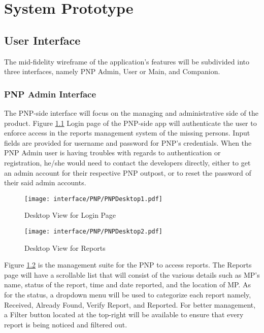 \chapter{System Prototype}

\section{User Interface}
The mid-fidelity wireframe of the application’s features will be subdivided into three interfaces, namely PNP Admin, User or Main, and Companion.

\subsection{PNP Admin Interface}
The PNP-side interface will focus on the managing and administrative side of the product. Figure \ref{fig:PNP1} Login page of the PNP-side app will authenticate the user to enforce access in the reports management system of the missing persons. Input fields are provided for username and password for PNP’s credentials. When the PNP Admin user is having troubles with regards to authentication or registration, he/she would need to contact the developers directly, either to get an admin account for their respective PNP outpost, or to reset the password of their said admin accounts.
\begin{figure}[!h]
    \centering
    \texttt{[image: interface/PNP/PNPDesktop1.pdf]}
    \caption{Desktop View for Login Page}
    \label{fig:PNP1}
\end{figure}

\begin{figure}[!h]
    \centering
    \texttt{[image: interface/PNP/PNPDesktop2.pdf]}
    \caption{Desktop View for Reports}
    \label{fig:PNP2}
\end{figure}
Figure \ref{fig:PNP2} is the management suite for the PNP to access reports. The Reports page will have a scrollable list that will consist of the various details such as MP’s name, status of the report, time and date reported, and the location of MP. As for the status, a dropdown menu will be used to categorize each report namely, Received, Already Found, Verify Report, and Reported. For better management, a Filter button located at the top-right will be available to ensure that every report is being noticed and filtered out.

